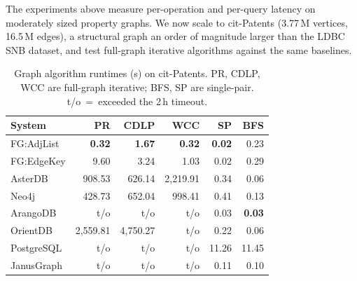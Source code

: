 The experiments above measure per-operation and per-query latency on moderately sized property graphs.
We now scale to cit-Patents (3.77\,M vertices, 16.5\,M edges), a structural graph an order of magnitude larger than the LDBC SNB dataset, and test full-graph iterative algorithms against the same baselines.
\begin{table}[h!]
  \centering
  \setlength{\tabcolsep}{2pt}
  \begin{tabular*}{\columnwidth}{@{\extracolsep{\fill}}lrrrrr@{}}
    \toprule
    System & PR & CDLP & WCC & SP & BFS \\
    \midrule
    FG:AdjList & \textbf{0.32} & \textbf{1.67} & \textbf{0.32} & \textbf{0.02} & 0.23 \\
    FG:EdgeKey & 9.60 & 3.24 & 1.03 & 0.02 & 0.29 \\
    AsterDB & 908.53 & 626.14 & 2{,}219.91 & 0.34 & 0.06 \\
    Neo4j & 428.73 & 652.04 & 998.41 & 0.41 & 0.13 \\
    ArangoDB & t/o & t/o & t/o & 0.03 & \textbf{0.03} \\
    OrientDB & 2{,}559.81 & 4{,}750.27 & t/o & 0.22 & 0.06 \\
    PostgreSQL & t/o & t/o & t/o & 11.26 & 11.45 \\
    JanusGraph & t/o & t/o & t/o & 0.11 & 0.10 \\
    \bottomrule
  \end{tabular*}
  \caption{Graph algorithm runtimes (s) on cit-Patents. PR, CDLP, WCC are full-graph iterative; BFS, SP are single-pair. t/o~=~exceeded the 2\,h timeout.}
  \label{tab:graph-algorithms}
\end{table}

